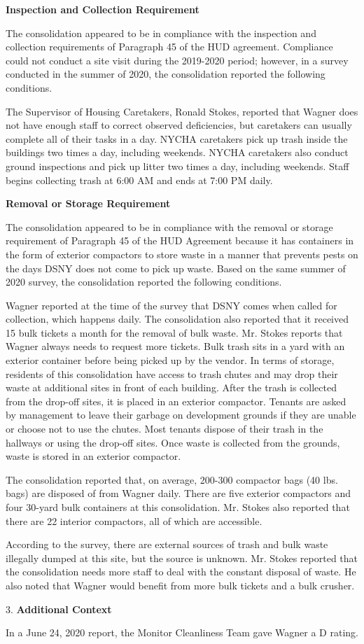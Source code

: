 
\textbf{Inspection and Collection Requirement}

The consolidation appeared to be in compliance with the inspection and collection requirements of Paragraph 45 of the HUD agreement. Compliance could not conduct a site visit during the 2019-2020 period; however, in a survey conducted in the summer of 2020, the consolidation reported the following conditions.

The Supervisor of Housing Caretakers, Ronald Stokes, reported that Wagner does not have enough staff to correct observed deficiencies, but caretakers can usually complete all of their tasks in a day. NYCHA caretakers pick up trash inside the buildings two times a day, including weekends. NYCHA caretakers also conduct ground inspections and pick up litter two times a day, including weekends. Staff begins collecting trash at 6:00 AM and ends at 7:00 PM daily. 

\textbf{Removal or Storage Requirement}

The consolidation appeared to be in compliance with the  removal or storage requirement of Paragraph  45 of the HUD Agreement because it has containers in the form of exterior compactors to store waste in a manner that prevents pests on the days DSNY does not come to pick up waste. Based on the same summer of  2020 survey, the consolidation reported the following conditions.

Wagner reported at the time of the survey that DSNY comes when called for collection, which happens daily. The consolidation also reported that it received 15 bulk tickets a month for the removal of bulk waste. Mr. Stokes reports that Wagner always needs to request more tickets. Bulk trash sits in a yard with an exterior container before being picked up by the vendor. In terms of storage, residents of this consolidation have access to trash chutes and may drop their waste at additional sites in front of each building. After the trash is collected from the drop-off sites, it is placed in an exterior compactor. Tenants are asked by management to leave their garbage on development grounds if they are unable or choose not to use the chutes. Most tenants dispose of their trash in the hallways or using the drop-off sites. Once waste is collected from the grounds, waste is stored in an exterior compactor. 

The consolidation reported that, on average, 200-300 compactor bags (40 lbs. bags) are disposed of from Wagner daily. There are five exterior compactors and four 30-yard bulk containers at this consolidation. Mr. Stokes also reported that there are 22 interior compactors, all of which are accessible. 

According to the survey, there are external sources of trash and bulk waste illegally dumped at this site, but the source is unknown. Mr. Stokes reported that the consolidation needs more staff to deal with the constant disposal of waste. He also noted that Wagner would benefit from more bulk tickets and a bulk crusher.

3. \textbf{Additional Context} 

In a June 24, 2020 report, the Monitor Cleanliness Team gave Wagner a D rating. 